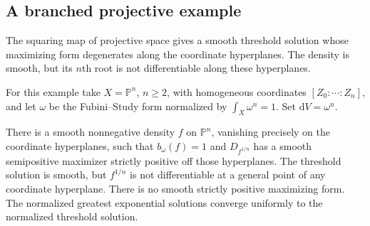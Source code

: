 \subsection{A branched projective example}

The squaring map of projective space gives a smooth threshold solution whose maximizing form degenerates along the coordinate hyperplanes. The density is smooth, but its $n$th root is not differentiable along these hyperplanes.

For this example take $X=\mathbb P^n$, $n\geq2$, with homogeneous coordinates $[Z_0:\cdots:Z_n]$, and let $\omega$ be the Fubini--Study form normalized by $\int_X\omega^n=1$. Set $\mathrm{d}V=\omega^n$.

\begin{example}\label{ex:semipositive-projective-maximizer}
There is a smooth nonnegative density $f$ on $\mathbb P^n$, vanishing precisely on the coordinate hyperplanes, such that $b_\omega(f)=1$ and $D_{f^{1/n}}$ has a smooth semipositive maximizer strictly positive off those hyperplanes. The threshold solution is smooth, but $f^{1/n}$ is not differentiable at a general point of any coordinate hyperplane. There is no smooth strictly positive maximizing form. The normalized greatest exponential solutions converge uniformly to the normalized threshold solution.
\end{example}
